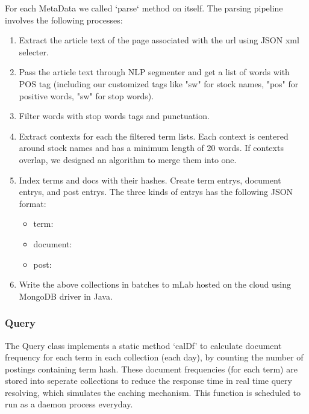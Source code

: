 \documentclass{article}
\begin{document}
For each MetaData we called `parse` method on itself. The parsing pipeline involves the following processes:
\begin{enumerate}
  \item Extract the article text of the page associated with the url using JSON xml selecter.
  \item Pass the article text through NLP segmenter and get a list of words with POS tag (including our customized tags like "sw" for stock names, "pos" for positive words, "sw" for stop words).
  \item Filter words with stop words tags and punctuation.
  \item Extract contexts for each the filtered term lists. Each context is centered around stock names and has a minimum length of 20 words. If contexts overlap, we designed an algorithm to merge them into one.
  \item Index terms and docs with their hashes. Create term entrys, document entrys, and post entrys. The three kinds of entrys has the following JSON format:
  \begin{itemize}
    \item term: \par
      \texttt{} \par
    \item document:\par
      \texttt{} \par
      \texttt{} \par
      \texttt{} \par
      \texttt{}\par
    \item post:\par
      \texttt{}\par
      \texttt{}
  \end{itemize}
  \item Write the above collections in batches to mLab hosted on the cloud using MongoDB driver in Java. 
\end{enumerate}

\subsubsection{Query}
The Query class implements a static method `calDf' to calculate document frequency for each term in each collection (each day), by counting the number of postings containing term hash. These document frequencies (for each term) are stored into seperate collections to reduce the response time in real time query resolving, which simulates the caching mechanism. This function is scheduled to run as a daemon process everyday.
\end{document}
